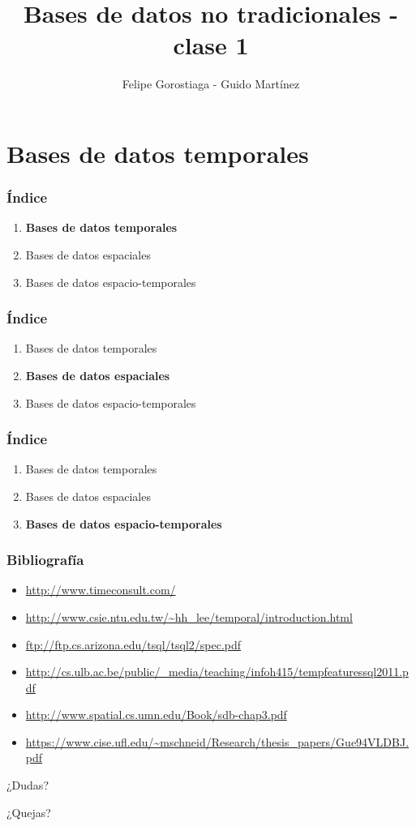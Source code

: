 \documentclass[obeyspaces,spaces,hyphens]{beamer}
\begin{document}
\title{Bases de datos no tradicionales - clase 1}
\author{Felipe Gorostiaga - Guido Martínez}

\begin{frame}
  \titlepage
\end{frame}

\section{Bases de datos temporales}

\begin{frame}
\frametitle{Índice}
	\begin{enumerate}
	\item {\bf Bases de datos temporales}
	\item Bases de datos espaciales
	\item Bases de datos espacio-temporales
	\end{enumerate}
\end{frame}



\begin{frame}
\frametitle{Índice}
	\begin{enumerate}
	\item Bases de datos temporales
	\item {\bf Bases de datos espaciales}
	\item Bases de datos espacio-temporales
	\end{enumerate}
\end{frame}



\begin{frame}
\frametitle{Índice}
	\begin{enumerate}
	\item Bases de datos temporales
	\item Bases de datos espaciales
	\item {\bf Bases de datos espacio-temporales}
	\end{enumerate}
\end{frame}



\begin{frame}
\frametitle{Bibliografía}
\begin{itemize}
	\item \url{http://www.timeconsult.com/}
	\item \url{http://www.csie.ntu.edu.tw/~hh_lee/temporal/introduction.html}
	\item \url{ftp://ftp.cs.arizona.edu/tsql/tsql2/spec.pdf}
	\item \url{http://cs.ulb.ac.be/public/_media/teaching/infoh415/tempfeaturessql2011.pdf}
	\item \url{http://www.spatial.cs.umn.edu/Book/sdb-chap3.pdf}
	\item \url{https://www.cise.ufl.edu/~mschneid/Research/thesis_papers/Gue94VLDBJ.pdf}
\end{itemize}
\end{frame}

\begin{frame}
\begin{center}
	¿Dudas?
	\pause

	¿Quejas?
\end{center}
\end{frame}
\end{document}
